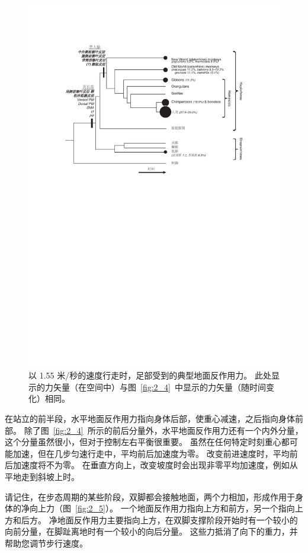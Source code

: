 \begin{figure}[!htb]
	\centering
	\includegraphics[width=1.0\linewidth]{chap2/2_6}
	\caption{以 1.55 米/秒的速度行走时，足部受到的典型地面反作用力。
		此处显示的力矢量（在空间中）与图~\ref{fig:2_4}~中显示的力矢量（随时间变化）相同。 \label{fig:2_6}}
\end{figure}


在站立的前半段，水平地面反作用力指向身体后部，使重心减速，之后指向身体前部。
除了图~\ref{fig:2_4}~所示的前后分量外，水平地面反作用力还有一个内外分量，这个分量虽然很小，但对于控制左右平衡很重要。
虽然在任何特定时刻重心都可能加速，但在几步匀速行走中，平均前后加速度为零。
改变前进速度时，平均前后加速度将不为零。
在垂直方向上，改变坡度时会出现非零平均加速度，例如从平地走到斜坡上时。


请记住，在步态周期的某些阶段，双脚都会接触地面，两个力相加，形成作用于身体的净向上力（图~\ref{fig:2_5}）。
一个地面反作用力指向上方和前方，另一个指向上方和后方。
净地面反作用力主要指向上方，在双脚支撑阶段开始时有一个较小的向前分量，在脚趾离地时有一个较小的向后分量。
这些力抵消了向下的重力，并帮助您调节步行速度。


